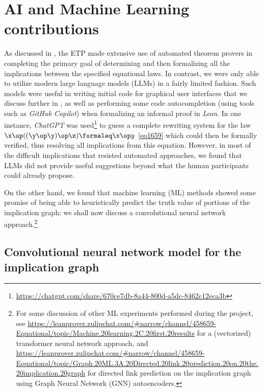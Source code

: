 \section{AI and Machine Learning contributions}\label{ml-sec}

As discussed in , the ETP made extensive use of automated theorem provers in completing the primary goal of determining and then formalizing all the implications between the specified equational laws.  In contrast, we were only able to utilize modern large language models (LLMs) in a fairly limited fashion.  Such models were useful in writing initial code for graphical user interfaces that we discuss further in , as well as performing some code autocompletion (using tools such as \emph{GitHub Copilot}) when formalizing an informal proof in \emph{Lean}.  In one instance, \emph{ChatGPT} was used\footnote{\url{https://chatgpt.com/share/670ce7db-8a44-800d-a5dc-8462c12eca3b}} to guess a complete rewriting system for the law $\x \op ((\y \op \y) \op \z) \formaleq \x \op y$ \eqref{eq1659} which could then be formally verified, thus resolving all implications from this equation. However, in most of the difficult implications that resisted automated approaches, we found that LLMs did not provide useful suggestions beyond what the human participants could already propose.

On the other hand, we found that machine learning (ML) methods showed some promise of being able to heuristically predict the truth value of portions of the implication graph; we shall now discuss a convolutional neural network approach.\footnote{For some discussion of other ML experiments performed during the project, see \url{https://leanprover.zulipchat.com/\#narrow/channel/458659-Equational/topic/Machine.20learning.2C.20first.20results} for a (vectorized) transformer neural network approach, and \url{https://leanprover.zulipchat.com/\#narrow/channel/458659-Equational/topic/Graph.20ML.3A.20Directed.20link.20prediction.20on.20the.20implication.20graph} for directed link prediction on the implication graph using Graph Neural Network (GNN) autoencoders.}

\subsection{Convolutional neural network model for the implication graph}


